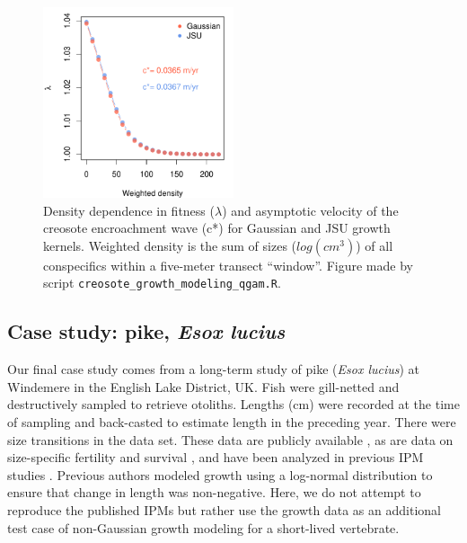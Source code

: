 \documentclass[12pt]{article}
\begin{document}
\begin{figure}[tbp]
	\centering
	\includegraphics[width=0.5\textwidth]{figures/creosote_DD_lambda.pdf}
	\caption{Density dependence in fitness ($\lambda$) and asymptotic velocity of the creosote encroachment wave (c*) for Gaussian and JSU growth kernels. Weighted density is the sum of sizes ($log(cm^3)$) of all conspecifics within a five-meter transect ``window''. Figure made by script \texttt{creosote\_growth\_modeling\_qgam.R}.}
	\label{fig:creosote_lambda_cstar}
\end{figure}

\subsection{Case study: pike, \emph{Esox lucius}}
\label{sec:pike}
Our final case study comes from a long-term study of pike (\emph{Esox lucius}) at Windemere in the English Lake District, UK. 
Fish were gill-netted and destructively sampled to retrieve otoliths. 
Lengths (cm) were recorded at the time of sampling and back-casted to estimate length in the preceding year. 
There were size transitions in the data set. 
These data are publicly available \citep{winfield2013pikegrowth}, as are data on size-specific fertility and survival \citep{winfield2013pikesurvival,winfield2013pikefecundity}, and have been analyzed in previous IPM studies \citep{vindenes2014effects,stubberud2019effects}. 
Previous authors modeled growth using a log-normal distribution to ensure that change in length was non-negative. 
Here, we do not attempt to reproduce the published IPMs but rather use the growth data as an additional test case of non-Gaussian growth modeling for a short-lived vertebrate. 
\end{document}

